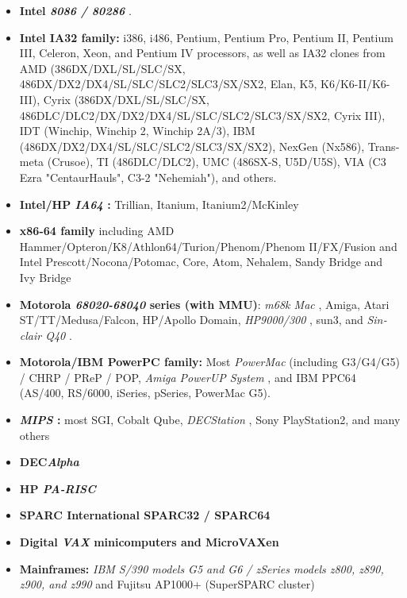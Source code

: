 \documentclass{HOWTO}
\begin{document}
\begin{latin}
\begin{itemize}
	\item {\bfseries Intel \emph{8086 / 80286} }.
	\item {\bfseries Intel IA32 family:} i386, i486, Pentium, Pentium Pro, 
		Pentium II, Pentium III, Celeron, Xeon, and Pentium IV processors, 
		as well as IA32 clones from AMD (386DX/DXL/SL/SLC/SX, 
		486DX/DX2/DX4/SL/SLC/SLC2/SLC3/SX/SX2, Elan, K5, 
		K6/K6-II/K6-III), Cyrix (386DX/DXL/SL/SLC/SX, 
		486DLC/DLC2/DX/DX2/DX4/SL/SLC/SLC2/SLC3/SX/SX2, Cyrix III), 
		IDT (Winchip, Winchip 2, Winchip 2A/3), 
		IBM (486DX/DX2/DX4/SL/SLC/SLC2/SLC3/SX/SX2),
		NexGen (Nx586), Transmeta (Crusoe), 
		TI (486DLC/DLC2), UMC (486SX-S, U5D/U5S), 
		VIA (C3 Ezra "CentaurHauls", C3-2 "Nehemiah"), 
		and others.
	\item {\bfseries Intel/HP \emph{IA64} :} Trillian, Itanium, Itanium2/McKinley
	\item {\bfseries x86-64 family} including AMD Hammer/Opteron/K8/Athlon64/Turion/Phenom/Phenom II/FX/Fusion and 
		Intel Prescott/Nocona/Potomac, Core, Atom, Nehalem, Sandy Bridge and Ivy Bridge
	\item {\bfseries Motorola \emph{68020-68040}
		 series (with MMU)}: 
		\emph{m68k Mac} ,
		Amiga, Atari ST/TT/Medusa/Falcon, HP/Apollo Domain,
		\emph{HP9000/300} , sun3, and 
		\emph{Sinclair Q40} .
	\item {\bfseries Motorola/IBM PowerPC family:} Most 
		\emph{PowerMac} 
		 (including G3/G4/G5)  / CHRP / PReP / POP, \emph{Amiga PowerUP System}
		 , and IBM PPC64 (AS/400, RS/6000, iSeries,	pSeries, PowerMac G5).
	\item {\bfseries \emph{MIPS} :} most SGI, Cobalt Qube, 
		\emph{DECStation} , Sony PlayStation2, and many others
	\item {\bfseries DEC\emph{Alpha} }
	\item {\bfseries HP \emph{PA-RISC} }
	\item {\bfseries SPARC International SPARC32 / SPARC64}
	\item {\bfseries Digital \emph{VAX}  minicomputers and MicroVAXen}
	\item {\bfseries Mainframes:} 
	\emph{IBM S/390 models G5 and G6 / zSeries models z800, z890, z900, and z990} 
		 and Fujitsu AP1000+ (SuperSPARC cluster)
\end{itemize}
\end{latin}
\end{document}
